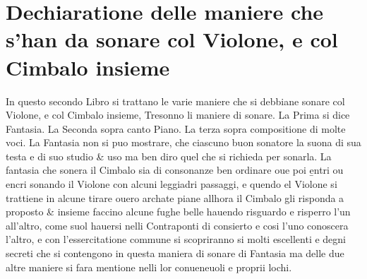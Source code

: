 
\chapter{Dechiaratione delle maniere che s'han da sonare col Violone, e col Cimbalo insieme}


In questo secondo Libro si trattano le varie maniere che si debbiane sonare col Violone, e col Cimbalo insieme, Tresonno li maniere di sonare. La Prima si dice Fantasia. La Seconda sopra canto Piano. La terza sopra compositione di molte voci. La Fantasia non si puo mostrare, che ciascuno buon sonatore la suona di sua testa e di suo studio \& uso ma ben diro quel che si richieda per sonarla. La fantasia che sonera il Cimbalo sia di consonanze ben ordinare oue poi \b{entri ou encri} sonando il Violone con alcuni leggiadri passaggi, e quendo el Violone si trattiene in alcune tirare ouero archate piane allhora il Cimbalo gli risponda a proposto \& insieme faccino alcune fughe belle hauendo risguardo e risperro l'un all'altro, come suol hauersi nelli Contraponti di consierto e cosi l'uno conoscera l'altro, e con l'essercitatione commune si scopriranno si molti escellenti e degni secreti che si contengono in questa maniera di sonare di Fantasia ma delle due altre maniere si fara mentione nelli lor conueneuoli e proprii lochi.



